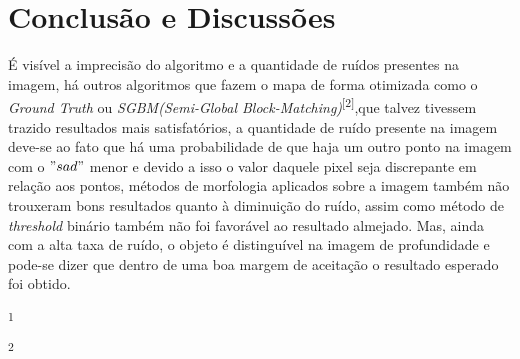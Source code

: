 \documentclass[conference,harvard,brazil,english]{sbatex}
\begin{document}
		
			
		
	\section{Conclusão e Discussões}
		\par É visível a imprecisão do algoritmo e a quantidade de ruídos presentes na imagem, há outros algoritmos que fazem o mapa de forma otimizada como o \textit{Ground Truth} ou \textit{SGBM(Semi-Global Block-Matching)}\textsuperscript{[2]},que talvez tivessem trazido resultados mais satisfatórios, a quantidade de ruído presente na imagem deve-se ao fato que há uma probabilidade de que haja um outro ponto na imagem com o $"sad"$ menor e devido a isso o valor daquele pixel seja discrepante em relação aos pontos, métodos de morfologia aplicados sobre a imagem também não trouxeram bons resultados quanto à diminuição do ruído, assim como método de \textit{threshold} binário também não foi favorável ao resultado almejado. Mas, ainda com a alta taxa de ruído, o objeto é distinguível na imagem de profundidade e pode-se dizer que dentro de uma boa margem de aceitação o resultado esperado foi obtido.
	
	
	\textsuperscript{1}\cite{SAD_Algorithm}
	
	\textsuperscript{2}\cite{stereopaper}
	\cite{docsocv}
	
\end{document}
